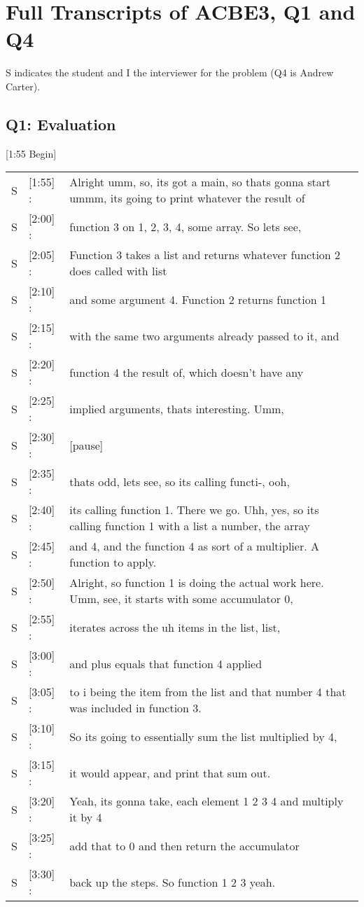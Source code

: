 \newpage

\section{Full Transcripts of ACBE3, Q1 and Q4}

S indicates the student and I the interviewer for the problem (Q4 is Andrew Carter).
\subsection{Q1: Evaluation}

[1:55 Begin] \\
\begin{tabular}{llp{13cm}}
S&[1:55] :&Alright umm, so, its got a main, so thats gonna start ummm, its going to print whatever the result of \\
S&[2:00] :& function 3 on 1, 2, 3, 4, some array. So lets see, \\
S&[2:05] :& Function 3 takes a list and returns whatever function  2 does called with list \\
S&[2:10] :& and some argument 4. Function 2 returns function 1 \\
S&[2:15] :& with the same two arguments already passed to it, and \\
S&[2:20] :& function 4 the result of, which doesn't have any \\
S&[2:25] :& implied arguments, thats interesting. Umm, \\
S&[2:30] :& [pause] \\
S&[2:35] :& thats odd, lets see, so its calling functi-, ooh, \\
S&[2:40] :& its calling function 1. There we go. Uhh, yes, so its calling function 1 with a list a number, the array \\
S&[2:45] :& and 4, and the function 4 as sort of a multiplier. A function to apply. \\
S&[2:50] :& Alright, so function 1 is doing the actual work here. Umm, see, it starts with some accumulator 0,  \\
S&[2:55] :& iterates across the uh items in the list, list, \\
S&[3:00] :& and plus equals that function 4 applied \\
S&[3:05] :& to i being the item from the list and that number 4 that was included in function 3. \\
S&[3:10] :& So its going to essentially sum the list multiplied by 4, \\
S&[3:15] :& it would appear, and print that sum out. \\
S&[3:20] :& Yeah, its gonna take, each element 1 2 3 4 and multiply it by 4 \\
S&[3:25] :& add that to 0 and then return the accumulator \\
S&[3:30] :& back up the steps. So function 1 2 3 yeah. 
\end{tabular} \\ 


